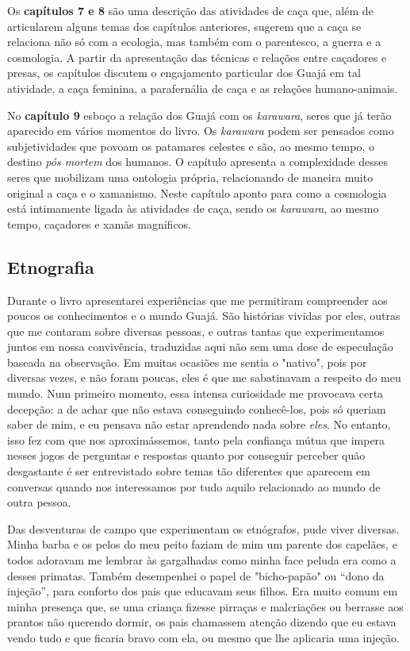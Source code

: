 Os \textbf{capítulos 7 e 8} são uma descrição das atividades de caça
que, além de articularem alguns temas dos capítulos anteriores, sugerem
que a caça se relaciona não só com a ecologia, mas também com o
parentesco, a guerra e a cosmologia. A partir da apresentação das
técnicas e relações entre caçadores e presas, os capítulos discutem o
engajamento particular dos Guajá em tal atividade, a caça feminina, a
parafernália de caça e as relações humano-animais.

No \textbf{capítulo 9} esboço a relação dos Guajá com os
\emph{karawara}, seres que já terão aparecido em vários momentos do
livro. Os \emph{karawara} podem ser pensados como subjetividades que
povoam os patamares celestes e são, ao mesmo tempo, o destino \emph{pós
mortem} dos humanos. O capítulo apresenta a complexidade desses seres
que mobilizam uma ontologia própria, relacionando de maneira muito
original a caça e o xamanismo. Neste capítulo aponto para como a
cosmologia está intimamente ligada às atividades de caça, sendo os
\emph{karawara}, ao mesmo tempo, caçadores e xamãs magníficos.

\hypertarget{etnografia}{%
\subsection{Etnografia}\label{etnografia}}

Durante o livro apresentarei experiências que me permitiram compreender
aos poucos os conhecimentos e o mundo Guajá. São histórias vividas por
eles, outras que me contaram sobre diversas pessoas, e outras tantas que
experimentamos juntos em nossa convivência, traduzidas aqui não sem uma
dose de especulação baseada na observação. Em muitas ocasiões me sentia
o "nativo", pois por diversas vezes, e não foram poucas, eles é que me
sabatinavam a respeito do meu mundo. Num primeiro momento, essa intensa
curiosidade me provocava certa decepção: a de achar que não estava
conseguindo conhecê-los, pois só queriam saber de mim, e eu pensava não
estar aprendendo nada sobre \emph{eles}. No entanto, isso fez com que
nos aproximássemos, tanto pela confiança mútua que impera nesses jogos
de perguntas e respostas quanto por conseguir perceber quão desgastante
é ser entrevistado sobre temas tão diferentes que aparecem em conversas
quando nos interessamos por tudo aquilo relacionado ao mundo de outra
pessoa.

Das desventuras de campo que experimentam os etnógrafos, pude viver
diversas. Minha barba e os pelos do meu peito faziam de mim um parente
dos capelães, e todos adoravam me lembrar às gargalhadas como minha face
peluda era como a desses primatas. Também desempenhei o papel de
"bicho-papão" ou ``dono da injeção'', para conforto dos pais que
educavam seus filhos. Era muito comum em minha presença que, se uma
criança fizesse pirraças e malcriações ou berrasse aos prantos não
querendo dormir, os pais chamassem atenção dizendo que eu estava vendo
tudo e que ficaria bravo com ela, ou mesmo que lhe aplicaria uma
injeção.


